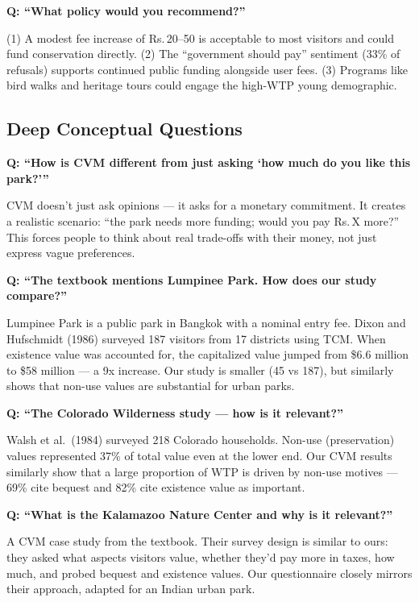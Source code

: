 \documentclass[11pt, a4paper]{article}
\newcommand{\rupee}{Rs.\,}
\newenvironment{ansbox}{%
    \def\FrameCommand{\textcolor{darkgreen}{\vrule width 2pt}\hspace{8pt}}%
    \MakeFramed{\advance\hsize-\width\FrameRestore}%
}{%
    \endMakeFramed%
}
\begin{document}
\textbf{Q: ``What policy would you recommend?''}
\begin{ansbox}
(1) A modest fee increase of \rupee 20--50 is acceptable to most visitors and could fund conservation directly. (2) The ``government should pay'' sentiment (33\% of refusals) supports continued public funding alongside user fees. (3) Programs like bird walks and heritage tours could engage the high-WTP young demographic.
\end{ansbox}

\subsection{Deep Conceptual Questions}

\textbf{Q: ``How is CVM different from just asking `how much do you like this park?'''}
\begin{ansbox}
CVM doesn't just ask opinions --- it asks for a monetary commitment. It creates a realistic scenario: ``the park needs more funding; would you pay \rupee X more?'' This forces people to think about real trade-offs with their money, not just express vague preferences.
\end{ansbox}

\textbf{Q: ``The textbook mentions Lumpinee Park. How does our study compare?''}
\begin{ansbox}
Lumpinee Park is a public park in Bangkok with a nominal entry fee. Dixon and Hufschmidt (1986) surveyed 187 visitors from 17 districts using TCM. When existence value was accounted for, the capitalized value jumped from \$6.6 million to \$58 million --- a 9x increase. Our study is smaller (45 vs 187), but similarly shows that non-use values are substantial for urban parks.
\end{ansbox}

\textbf{Q: ``The Colorado Wilderness study --- how is it relevant?''}
\begin{ansbox}
Walsh et al.\ (1984) surveyed 218 Colorado households. Non-use (preservation) values represented 37\% of total value even at the lower end. Our CVM results similarly show that a large proportion of WTP is driven by non-use motives --- 69\% cite bequest and 82\% cite existence value as important.
\end{ansbox}

\textbf{Q: ``What is the Kalamazoo Nature Center and why is it relevant?''}
\begin{ansbox}
A CVM case study from the textbook. Their survey design is similar to ours: they asked what aspects visitors value, whether they'd pay more in taxes, how much, and probed bequest and existence values. Our questionnaire closely mirrors their approach, adapted for an Indian urban park.
\end{ansbox}
\end{document}
